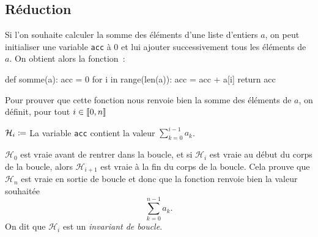 \documentclass{magnoliaold}
\begin{document}




    

\subsection{Réduction}

Si l'on souhaite calculer la somme des éléments d'une liste d'entiers $a$, on peut initialiser
une variable \verb_acc_ à 0 et lui ajouter successivement tous les éléments de $a$. On obtient
alors la fonction~:

\begin{pythoncodeline}
def somme(a):
    acc = 0
    for i in range(len(a)):
        acc = acc + a[i]
    return acc
\end{pythoncodeline}
\noindent
Pour prouver que cette fonction nous renvoie bien
la somme des éléments de $a$, on définit, pour tout $i\in\left\llbracket 0,n\right\rrbracket$

\begin{center}
$\mathcal{H}_i \coloneqq$ \og La variable \verb_acc_ contient la valeur
$\displaystyle\sum_{k=0}^{i-1} a_k$. \fg
\end{center}
\noindent
$\mathcal{H}_0$ est vraie avant de rentrer dans la boucle, et si $\mathcal{H}_i$ est vraie au début du
corps de la boucle, alors $\mathcal{H}_{i+1}$ est vraie à la fin du corps de la boucle. Cela prouve que $\mathcal{H}_n$ est vraie
en sortie de boucle et donc que la fonction renvoie bien la valeur souhaitée
\[\sum_{k=0}^{n-1} a_k.\]
On dit que $\mathcal{H}_i$ est un \emph{invariant de boucle}.\\
\end{document}
